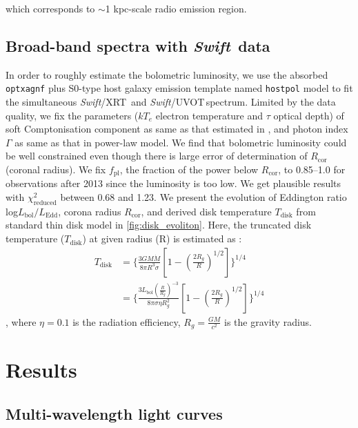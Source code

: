 \documentclass[twocolumn]{aastex63}
\newcommand{\swift}{{\small \it Swift}}
\newcommand{\xrt}{{\small {\it Swift}/XRT}}
\newcommand{\uvot}{{\small {\it Swift}/UVOT}}
\begin{document}
which corresponds to $\sim$1 kpc-scale radio emission region.

\subsection{Broad-band spectra with \swift\, data}
\label{swift-sed}

In order to roughly estimate the bolometric luminosity, we use the absorbed \texttt{optxagnf} plus S0-type host galaxy
emission template named \texttt{hostpol} \citep{2007ApJ...663...81P} model to fit the simultaneous \xrt\, and \uvot \,spectrum. Limited by the data quality, we fix the parameters ($kT_e$ electron temperature and $\tau$ optical depth) of soft Comptonisation component as same as that estimated in \citep{2018MNRAS.480.3898N}, and photon index $\Gamma$ as same as that in power-law model. We find that bolometric luminosity could be well constrained even though there is large error of determination of $R_\mathrm{cor}$ (coronal radius). We fix $f_\mathrm{pl}$, the fraction of the power below $R_\mathrm{cor}$, to 0.85--1.0 \citep[see also][]{2018MNRAS.480.3898N} for observations after 2013 since the luminosity is too low. We get plausible results with $\chi^2_\mathrm{reduced}$ between 0.68 and 1.23. We present the evolution of Eddington ratio log$L_\mathrm{bol}/L_\mathrm{Edd}$, corona radius $R_\mathrm{cor}$, and derived disk temperature $T_\mathrm{disk}$ from standard thin disk model in \autoref{fig:disk_evoliton}. Here,  the truncated disk temperature ($T_\mathrm{disk}$) at given radius (R) is estimated as :
\begin{equation}
\begin{aligned}
    T_\mathrm{disk} & = \{\frac{3GM\dot{M}}{8\pi R^3 \sigma}[1-(\frac{2 R_g}{R})^{1/2}]\}^{1/4} \\ & = \{\frac{3 L_\mathrm{bol} (\frac{R}{R_g})^{-3}}{8\pi \sigma \eta R_g^2}[1-(\frac{2 R_g}{R})^{1/2}]\}^{1/4}
\end{aligned}
\end{equation}, where $\eta=0.1$ is the radiation efficiency, $R_g=\frac{GM}{c^2}$ is the gravity radius.



\section{Results}
\label{sec:result}

\subsection{Multi-wavelength light curves}
\label{sec:multi-lc}
\end{document}

